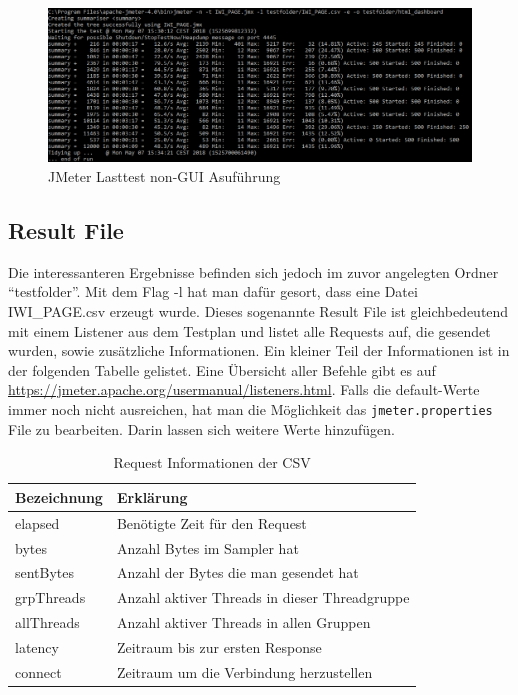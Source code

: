 \documentclass[a4paper,12pt]{article}
\newcommand{\codeInLine}[1]{%
\colorbox{graybackgroundColor}{\lstinline{#1}} %
}
\begin{document}
\begin{figure}[htb]%
 \centering
    \includegraphics[width=1\textwidth]{bilder/start_jmeter_cmd.png}
  \caption{JMeter Lasttest non-GUI Asuführung}
  \label{fig:start_jmeter_cmd}
\end{figure}

\subsection{Result File}
Die interessanteren Ergebnisse befinden sich jedoch im zuvor angelegten Ordner "`testfolder"'. Mit dem Flag -l hat man dafür gesort, dass eine Datei IWI\_PAGE.csv erzeugt wurde. Dieses sogenannte Result File ist gleichbedeutend mit einem Listener aus dem Testplan und listet alle Requests auf, die gesendet wurden, sowie zusätzliche Informationen. Ein kleiner Teil der Informationen ist in der folgenden Tabelle gelistet. Eine Übersicht aller Befehle gibt es auf \url{https://jmeter.apache.org/usermanual/listeners.html}. Falls die default-Werte immer noch nicht ausreichen, hat man die Möglichkeit das \codeInLine{jmeter.properties} File zu bearbeiten. Darin lassen sich weitere Werte hinzufügen.  

\begin{table}[H]
	\centering
	\begin{tabular}{|l|l|}
		\hline
		\textbf{Bezeichnung} & \textbf{Erklärung} \\
		\hline
		elapsed & Benötigte Zeit für den Request \\
		bytes & Anzahl Bytes im Sampler hat \\
		sentBytes & Anzahl der Bytes die man gesendet hat \\
		grpThreads & Anzahl aktiver Threads in dieser Threadgruppe \\
		allThreads & Anzahl aktiver Threads in allen Gruppen \\
		latency & Zeitraum bis zur ersten Response \\
		connect & Zeitraum um die Verbindung herzustellen \\
		\hline
	\end{tabular}
	\caption[tab_csv_file]{Request Informationen der CSV}
	\label{tab_csv_file}
\end{table}
\end{document}
